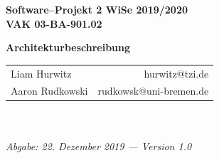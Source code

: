\documentclass[enabledeprecatedfontcommands,fontsize=12pt,paper=a4,twoside]{scrartcl}
\begin{document}
  \thispagestyle{fancy}
  \fancyhead[LO,RE]{ }
  \fancyfoot[C]{}

  \vspace{3cm}

  \begin{minipage}[H]{\textwidth}
  \begin{center}
  \bf
  \Large
  Software--Projekt 2 WiSe 2019/2020\\
  \smallskip
  \small
  VAK 03-BA-901.02\\
  \vspace{3cm}
  \end{center}
  \end{minipage}
  \begin{minipage}[H]{\textwidth}
  \begin{center}
  \vspace{1cm}
  \bf
  \Large Architekturbeschreibung\\
  \vfill
  \end{center}
  \end{minipage}
  \vfill
  \begin{minipage}[H]{\textwidth}
  \begin{center}
  \sf
  \begin{tabular}{lr}
  Liam Hurwitz & hurwitz@tzi.de \\
  Aaron Rudkowski & rudkowsk@uni-bremen.de \\
  \end{tabular}
  \\ ~
  \vspace{2cm}
  \\
  \it Abgabe: 22. Dezember 2019 --- Version 1.0\\ ~
  \end{center}
  \end{minipage}



\newpage

  \thispagestyle{fancy}
  \fancyhead{}
  \fancyfoot{}
  \renewcommand{\headrulewidth}{0.4pt}
  \tableofcontents
\end{document}
